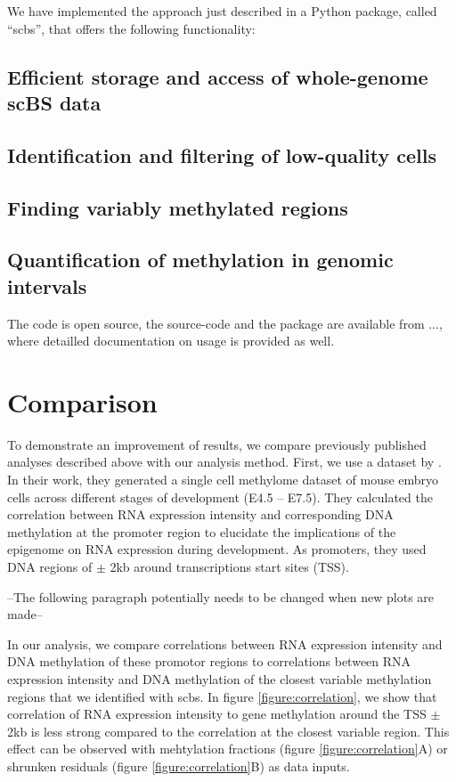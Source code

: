 \documentclass[twocolumn,10pt]{article}
\begin{document}
We have implemented the approach just described in a Python package, called ``scbs'', that offers the following functionality:

\subsection{Efficient storage and access of whole-genome scBS data}

\subsection{Identification and filtering of low-quality cells}

\subsection{Finding variably methylated regions}

\subsection{Quantification of methylation in genomic intervals}



The code is open source, the source-code and the package are available from ..., where detailled documentation on usage is provided as well.

\section{Comparison}

To demonstrate an improvement of results, we compare previously published analyses described above with our analysis method.
First, we use a dataset by \citealp{Argelaguet_2019}. In their work, they generated a single cell methylome dataset of mouse embryo cells across different stages of development (E4.5 – E7.5). They calculated the correlation between RNA expression intensity and corresponding DNA methylation at the promoter region to elucidate the implications of the epigenome on RNA expression during development. As promoters, they used DNA regions of $\pm$ 2kb around transcriptions start sites (TSS). 


--The following paragraph potentially needs to be changed when new plots are made--


In our analysis, we compare correlations between RNA expression intensity and DNA methylation of these promotor regions to correlations between RNA expression intensity and DNA methylation of the closest variable methylation regions that we identified with scbs. In figure \ref{figure:correlation}, we show that correlation of RNA expression intensity to gene methylation around the TSS $\pm$ 2kb is less strong compared to the correlation at the closest variable region. This effect can be observed with mehtylation fractions (figure \ref{figure:correlation}A) or shrunken residuals (figure \ref{figure:correlation}B) as data inputs.
\end{document}
